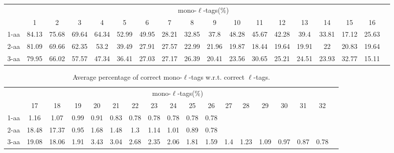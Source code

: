 \documentclass{article}[12pt]
\begin{document}
\begin{landscape}

\begin{table}[h]\tiny
\vspace{3mm}
{\centering
\begin{center}
\begin{tabular}{|l|c|c|c|c|c|c|c|c|c|c|c|c|c|c|c|c|c|}
  \hline
  & \multicolumn{ 16 }{|c|}{mono-$\ell$-tags(\%)} \\
  \cline{2- 17}
    & 1 & 2 & 3 & 4 & 5 & 6 & 7 & 8 & 9 & 10 & 11 & 12 & 13 & 14 & 15 & 16\\
  \hline
1-aa  & 84.13 & 75.68 & 69.64 & 64.34 & 52.99 & 49.95 & 28.21 & 32.85 & 37.8 & 48.28 & 45.67 & 42.28 & 39.4 & 33.81 & 17.12 & 25.63\\
2-aa  & 81.09 & 69.66 & 62.35 & 53.2 & 39.49 & 27.91 & 27.57 & 22.99 & 21.96 & 19.87 & 18.44 & 19.64 & 19.91 & 22 & 20.83 & 19.64\\
3-aa  & 79.95 & 66.02 & 57.57 & 47.34 & 36.41 & 27.03 & 27.17 & 26.39 & 20.41 & 23.56 & 30.65 & 25.21 & 24.51 & 23.93 & 32.77 & 15.11\\
 \hline
\end{tabular}
\end{center}
\par}
\centering

\vspace{3mm}
\end{table}
\begin{table}[h]\tiny
\vspace{3mm}
{\centering
\begin{center}
\begin{tabular}{|l|c|c|c|c|c|c|c|c|c|c|c|c|c|c|c|c|c|}
  \hline
  & \multicolumn{ 16 }{|c|}{mono-$\ell$-tags(\%)} \\
  \cline{2- 17}
    & 17 & 18 & 19 & 20 & 21 & 22 & 23 & 24 & 25 & 26 & 27 & 28 & 29 & 30 & 31 & 32\\
  \hline
1-aa  & 1.16 & 1.07 & 0.99 & 0.91 & 0.83 & 0.78 & 0.78 & 0.78 & 0.78 & 0.78 &  &  &  &  &  & \\
2-aa  & 18.48 & 17.37 & 0.95 & 1.68 & 1.48 & 1.3 & 1.14 & 1.01 & 0.89 & 0.78 &  &  &  &  &  & \\
3-aa  & 19.08 & 18.06 & 1.91 & 3.43 & 3.04 & 2.68 & 2.35 & 2.06 & 1.81 & 1.59 & 1.4 & 1.23 & 1.09 & 0.97 & 0.87 & 0.78\\
 \hline
\end{tabular}
\end{center}
\par}
\centering

\caption{ Average percentage of correct mono-$\ell$-tags w.r.t. correct $\ell$-tags.}
\label{table:l-mono-correct-rel}

\vspace{3mm}
\end{table}
\end{landscape}
\end{document}
